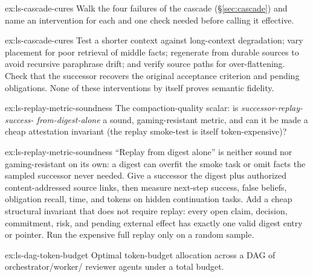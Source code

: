 \documentclass[11pt,a4paper]{article}
\theoremstyle{definition}
\theoremstyle{plain}
\begin{document}
\begin{pdexercise}[kind=Trace,rating=2]{ex:ls-cascade-cures}
Walk the four failures of the cascade
(\S\ref{sec:cascade}) and name an intervention for each and one check needed before calling it effective.
\end{pdexercise}
\begin{pdsolution}{ex:ls-cascade-cures}
Test a shorter context against long-context degradation; vary placement for
poor retrieval of middle facts; regenerate from durable sources to avoid
recursive paraphrase drift; and verify source paths for over-flattening.
Check that the successor recovers the original acceptance criterion and pending
obligations. None of these interventions by itself proves semantic fidelity.
\end{pdsolution}
\begin{pdexercise}[kind=Open,rating=3]{ex:ls-replay-metric-soundness}
The compaction-quality scalar: is \emph{successor-replay-success-
from-digest-alone} a sound, gaming-resistant metric, and can it be made a cheap
attestation invariant (the replay smoke-test is itself token-expensive)?
\end{pdexercise}
\begin{pdsolution}{ex:ls-replay-metric-soundness}
``Replay from digest alone'' is neither sound nor gaming-resistant on its own: a digest can overfit the smoke task or omit facts the sampled successor never needed. Give a successor the digest plus authorized content-addressed source links, then measure next-step success, false beliefs, obligation recall, time, and tokens on hidden continuation tasks. Add a cheap structural invariant that does not require replay: every open claim, decision, commitment, risk, and pending external effect has exactly one valid digest entry or pointer. Run the expensive full replay only on a random sample.
\end{pdsolution}
\begin{pdexercise}[kind=Open,rating=3]{ex:ls-dag-token-budget}
Optimal token-budget allocation across a DAG of orchestrator/worker/
reviewer agents under a total budget.
\end{pdexercise}
\end{document}
